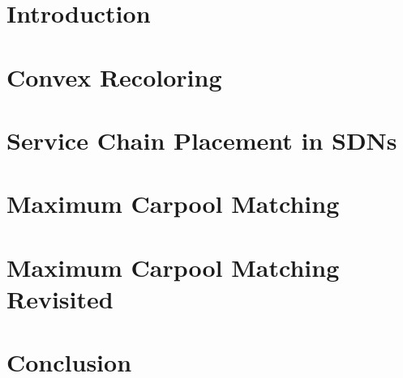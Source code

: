 \newcommand{\defpath}[1]{\def\path{content/#1}}
\newcommand{\add}[1]{}

\chapter{Introduction}
\defpath{introduction}
\add{introduction}

\chapter{Convex Recoloring}
\defpath{2cr}
\add{2cr}

\chapter{Service Chain Placement in SDNs}
\defpath{vpn}
\add{vpn}

\chapter{Maximum Carpool Matching}
\defpath{carpool}
\add{carpool}

\chapter{Maximum Carpool Matching Revisited}
\defpath{carpool-new}
\add{carpool-new}

\chapter{Conclusion}
\defpath{conclusion}
\add{conclusion}